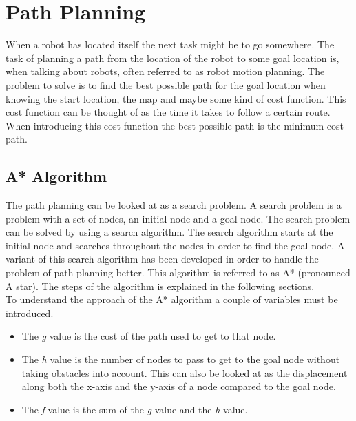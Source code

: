 
\section{Path Planning} %
\label{sec:path_planning}

When a robot has located itself the next task might be to go somewhere. The task of planning a path from the location of the robot to some goal location is, when talking about robots, often referred to as robot motion planning. The problem to solve is to find the best possible path for the goal location when knowing the start location, the map and maybe some kind of cost function. This cost function can be thought of as the time it takes to follow a certain route. When introducing this cost function the best possible path is the minimum cost path. \\

\subsection{A* Algorithm} %
\label{sub:a_algorithm}

The path planning can be looked at as a search problem. A search problem is a problem with a set of nodes, an initial node and a goal node. The search problem can be solved by using a search algorithm. The search algorithm starts at the initial node and searches throughout the nodes in order to find the goal node. A variant of this search algorithm has been developed in order to handle the problem of path planning better. This algorithm is referred to as A* (pronounced A star). The steps of the algorithm is explained in the following sections. \\

To understand the approach of the A* algorithm a couple of variables must be introduced. \\

\begin{itemize}
	\item The \emph{g} value is the cost of the path used to get to that node.

	\item The \emph{h} value is the number of nodes to pass to get to the goal node without taking obstacles into account. This can also be looked at as the displacement along both the x-axis and the y-axis of a node compared to the goal node.

	\item The \emph{f} value is the sum of the \emph{g} value and the \emph{h} value.\\
\end{itemize}

